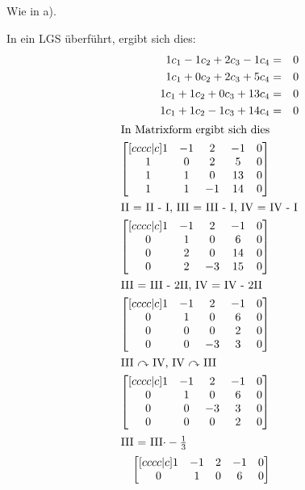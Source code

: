 \documentclass[10pt,a4paper,oneside,ngerman,numbers=noenddot]{scrartcl}
\begin{document}
\subsection{} %
Wie in a).

In ein LGS überführt, ergibt sich dies:\\
\begin{alignat*}{2}
1c_{1} - 1c_{2} + 2c_{3} - 1c_{4} &=& 0 \\
1c_{1} + 0c_{2} + 2c_{3} + 5c_{4} &=& 0 \\
1c_{1} + 1c_{2} + 0c_{3} + 13c_{4} &=& 0 \\
1c_{1} + 1c_{2} - 1c_{3} + 14c_{4} &=& 0 \\
\intertext{In Matrixform ergibt sich dies}
\begin{bmatrix}[cccc|c]
1 & -1 & 2 & -1 & 0 \\
1 & 0 & 2 & 5 & 0 \\
1 & 1 & 0 & 13 & 0 \\
1 & 1 & -1 & 14 & 0
\end{bmatrix} \\
\intertext{II = II - I, III = III - I, IV = IV - I}
\begin{bmatrix}[cccc|c]
1 & -1 & 2 & -1 & 0 \\
0 & 1 & 0 & 6 & 0 \\
0 & 2 & 0 & 14 & 0 \\
0 & 2 & -3 & 15 & 0
\end{bmatrix}  \\
\intertext{III = III - 2II, IV = IV - 2II}
\begin{bmatrix}[cccc|c]
1 & -1 & 2 & -1 & 0 \\
0 & 1 & 0 & 6 & 0 \\
0 & 0 & 0 & 2 & 0 \\
0 & 0 & -3 & 3 & 0
\end{bmatrix} \\
\intertext{III $\curvearrowright$ IV, IV $\curvearrowright$ III}
\begin{bmatrix}[cccc|c]
1 & -1 & 2 & -1 & 0 \\
0 & 1 & 0 & 6 & 0 \\
0 & 0 & -3 & 3 & 0 \\
0 & 0 & 0 & 2 & 0
\end{bmatrix} \\
\intertext{III = III$ \cdot -\frac{1}{3}$}
\begin{bmatrix}[cccc|c]
1 & -1 & 2 & -1 & 0 \\
0 & 1 & 0 & 6 & 0 \\

\end{bmatrix}
\end{alignat*}
\end{document}

